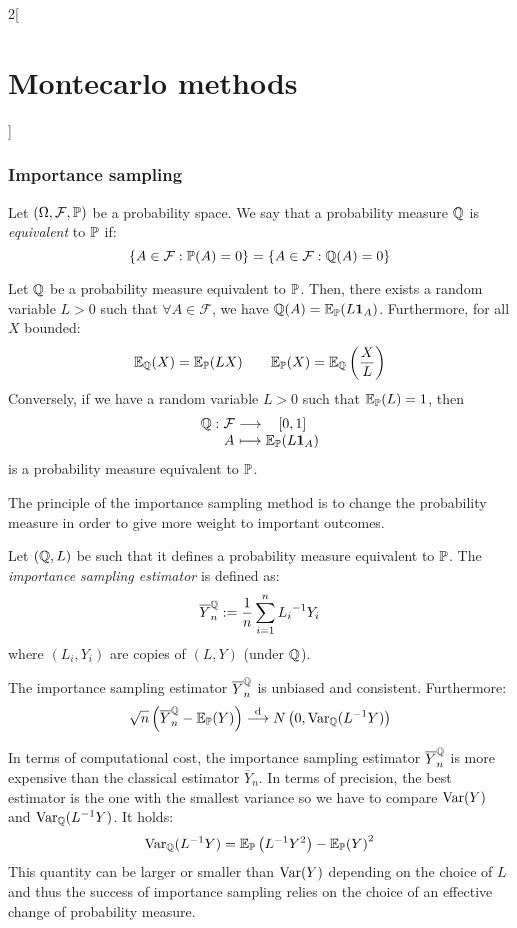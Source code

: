 \documentclass[../../../main_math.tex]{subfiles}
\begin{document}
\begin{multicols}{2}[\section{Montecarlo methods}]
  \subsubsection{Importance sampling}
  \begin{definition}
    Let $(\Omega, \mathcal{F}, \mathbb{P})$ be a probability space. We say that a probability measure $\mathbb{Q}$ is \emph{equivalent} to $\mathbb{P}$ if:
    $$
      \{A\in \mathcal{F} : \mathbb{P}(A)=0\}=\{A\in \mathcal{F} : \mathbb{Q}(A)=0\}
    $$
  \end{definition}
  \begin{lemma}
    Let $\mathbb{Q}$ be a probability measure equivalent to $\mathbb{P}$. Then, there exists a random variable $L>0$ such that $\forall A\in \mathcal{F}$, we have $\mathbb{Q}(A)=\mathbb{E}_{\mathbb{P}}(L\boldsymbol{\mathrm{1}}_{A})$. Furthermore, for all $X$ bounded:
    $$
      \mathbb{E}_{\mathbb{Q}}(X)=\mathbb{E}_{\mathbb{P}}(L X)\qquad \mathbb{E}_{\mathbb{P}}(X)=\mathbb{E}_{\mathbb{Q}}\left(\frac{X}{L}\right)
    $$
    Conversely, if we have a random variable $L>0$ such that $\mathbb{E}_{\mathbb{P}}(L)=1$, then
    $$
      \function{\QQ}{\mathcal{F}}{[0,1]}{A}{\Exp_\Prob(L\indi{A})}
    $$
    is a probability measure equivalent to $\mathbb{P}$.
  \end{lemma}
  \begin{remark}
    The principle of the importance sampling method is to change the probability measure in order to give more weight to important outcomes.
  \end{remark}
  \begin{definition}
    Let $(\mathbb{Q},L)$ be such that it defines a probability measure equivalent to $\mathbb{P}$. The \emph{importance sampling estimator} is defined as:
    $$
      \overline{Y}_n^{\mathbb{Q}}:=\frac{1}{n}\sum_{i=1}^n {L_i}^{-1}Y_i
    $$
    where $(L_i,Y_i)$ are \iid copies of $(L,Y)$ (under $\mathbb{Q}$).
  \end{definition}
  \begin{lemma}
    The importance sampling estimator $\overline{Y}_n^{\mathbb{Q}}$ is unbiased and consistent. Furthermore:
    $$
      \sqrt{n}\left(\overline{Y}_n^{\mathbb{Q}}-\mathbb{E}_{\mathbb{P}}(Y)\right)\overset{\text{d}}{\longrightarrow}N\left(0,\mathrm{Var}_{\mathbb{Q}}(L^{-1}Y)\right)
    $$
  \end{lemma}
  \begin{remark}
    In terms of computational cost, the importance sampling estimator $\overline{Y}_n^{\mathbb{Q}}$ is more expensive than the classical estimator $\overline{Y}_n$. In terms of precision, the best estimator is the one with the smallest variance so we have to compare $\mathrm{Var}(Y)$ and $\mathrm{Var}_{\mathbb{Q}}(L^{-1}Y)$. It holds:
    $$
      \mathrm{Var}_{\mathbb{Q}}(L^{-1}Y)=\mathbb{E}_{\mathbb{P}}\left(L^{-1}Y^2\right)-{\mathbb{E}_{\mathbb{P}}(Y)}^2
    $$
    This quantity can be larger or smaller than $\mathrm{Var}(Y )$ depending on the choice of $L$ and thus the success of importance sampling relies on the choice of an effective change of probability measure.
  \end{remark}
\end{multicols}
\end{document}

